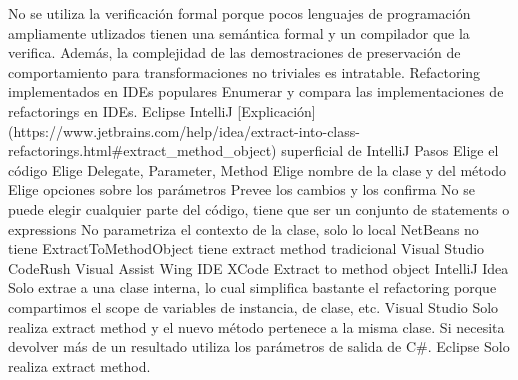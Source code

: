 No se utiliza la verificación formal porque pocos lenguajes de programación ampliamente utlizados
    tienen una semántica formal y un compilador que la verifica. Además, la complejidad de las
    demostraciones de preservación de comportamiento para transformaciones no triviales es
    intratable. Refactoring implementados en IDEs populares Enumerar y compara las implementaciones
    de refactorings en IDEs. Eclipse IntelliJ
    [Explicación](https://www.jetbrains.com/help/idea/extract-into-class-refactorings.html#extract_method_object)
    superficial de IntelliJ Pasos Elige el código Elige Delegate, Parameter, Method Elige nombre de
    la clase y del método Elige opciones sobre los parámetros Prevee los cambios y los confirma No
    se puede elegir cualquier parte del código, tiene que ser un conjunto de statements o
    expressions No parametriza el contexto de la clase, solo lo local NetBeans no tiene
    ExtractToMethodObject tiene extract method tradicional Visual Studio CodeRush Visual Assist Wing
    IDE XCode Extract to method object IntelliJ Idea Solo extrae a una clase interna, lo cual
    simplifica bastante el refactoring porque compartimos el scope de variables de instancia, de
    clase, etc. Visual Studio Solo realiza extract method y el nuevo método pertenece a la misma
    clase. Si necesita devolver más de un resultado utiliza los parámetros de salida de C#. Eclipse
    Solo realiza extract method.